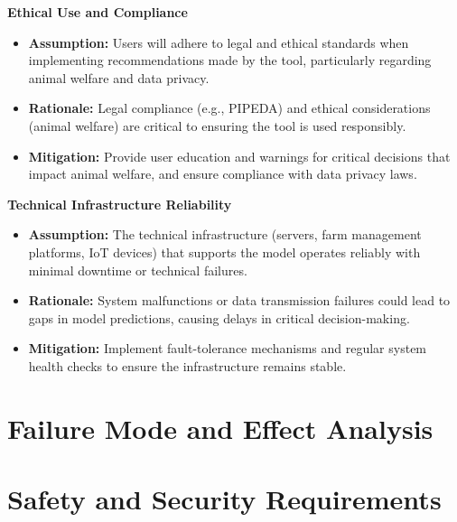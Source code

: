 \documentclass{article}
\begin{document}
\textbf{Ethical Use and Compliance}
\begin{itemize}
    \item \textbf{Assumption:} Users will adhere to legal and ethical standards 
    when implementing recommendations made by the tool, particularly regarding 
    animal welfare and data privacy.
    \item \textbf{Rationale:} Legal compliance (e.g., PIPEDA) and ethical 
    considerations (animal welfare) are critical to ensuring the tool is used 
    responsibly.
    \item \textbf{Mitigation:} Provide user education and warnings for critical 
    decisions that impact animal welfare, and ensure compliance with data privacy laws.
\end{itemize}

\textbf{Technical Infrastructure Reliability}
\begin{itemize}
    \item \textbf{Assumption:} The technical infrastructure (servers, farm 
    management platforms, IoT devices) that supports the model operates 
    reliably with minimal downtime or technical failures.
    \item \textbf{Rationale:} System malfunctions or data transmission failures 
    could lead to gaps in model predictions, causing delays in critical 
    decision-making.
    \item \textbf{Mitigation:} Implement fault-tolerance mechanisms and 
    regular system health checks to ensure the infrastructure remains stable.
\end{itemize}


\section{Failure Mode and Effect Analysis}


\section{Safety and Security Requirements}
\end{document}
